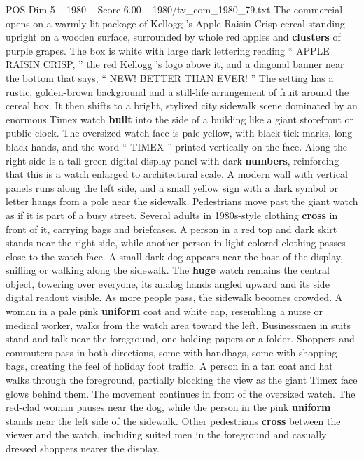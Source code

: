 \begin{textsample}{POS Dim 5 – 1980 – Score 6.00 – 1980/tv\_com\_1980\_79.txt}  \label{ex:f5_pos_039}
The commercial opens on a warmly lit package of Kellogg ’s Apple Raisin Crisp cereal standing upright on a wooden surface, surrounded by whole red apples and \textbf{clusters} of purple grapes.
The box is white with large dark lettering reading “ APPLE RAISIN CRISP, ” the red Kellogg ’s logo above it, and a diagonal banner near the bottom that says, “ NEW!
BETTER THAN EVER! ” The setting has a rustic, golden-brown background and a still-life arrangement of fruit around the cereal box.
It then shifts to a bright, stylized city sidewalk scene dominated by an enormous Timex watch \textbf{built} into the side of a building like a giant storefront or public clock.
The oversized watch face is pale yellow, with black tick marks, long black hands, and the word “ TIMEX ” printed vertically on the face.
Along the right side is a tall green digital display panel with dark \textbf{numbers}, reinforcing that this is a watch enlarged to architectural scale.
A modern wall with vertical panels runs along the left side, and a small yellow sign with a dark symbol or letter hangs from a pole near the sidewalk.
Pedestrians move past the giant watch as if it is part of a busy street.
Several adults in 1980s-style clothing \textbf{cross} in front of it, carrying bags and briefcases.
A person in a red top and dark skirt stands near the right side, while another person in light-colored clothing passes close to the watch face.
A small dark dog appears near the base of the display, sniffing or walking along the sidewalk.
The \textbf{huge} watch remains the central object, towering over everyone, its analog hands angled upward and its side digital readout visible.
As more people pass, the sidewalk becomes crowded.
A woman in a pale pink \textbf{uniform} coat and white cap, resembling a nurse or medical worker, walks from the watch area toward the left.
Businessmen in suits stand and talk near the foreground, one holding papers or a folder.
Shoppers and commuters pass in both directions, some with handbags, some with shopping bags, creating the feel of holiday foot traffic.
A person in a tan coat and hat walks through the foreground, partially blocking the view as the giant Timex face glows behind them.
The movement continues in front of the oversized watch.
The red-clad woman pauses near the dog, while the person in the pink \textbf{uniform} stands near the left side of the sidewalk.
Other pedestrians \textbf{cross} between the viewer and the watch, including suited men in the foreground and casually dressed shoppers nearer the display.

\end{textsample}

